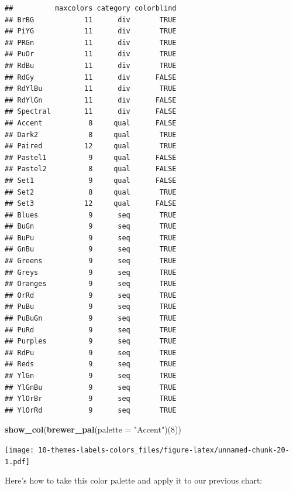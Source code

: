 \documentclass[]{book}
\newenvironment{Shaded}{\begin{snugshade}}{\end{snugshade}}
\newcommand{\KeywordTok}[1]{\textcolor[rgb]{0.13,0.29,0.53}{\textbf{{#1}}}}
\newcommand{\DataTypeTok}[1]{\textcolor[rgb]{0.13,0.29,0.53}{{#1}}}
\newcommand{\DecValTok}[1]{\textcolor[rgb]{0.00,0.00,0.81}{{#1}}}
\newcommand{\StringTok}[1]{\textcolor[rgb]{0.31,0.60,0.02}{{#1}}}
\newcommand{\NormalTok}[1]{{#1}}
\theoremstyle{definition}
\theoremstyle{definition}
\theoremstyle{remark}
\begin{document}
\begin{verbatim}
##          maxcolors category colorblind
## BrBG            11      div       TRUE
## PiYG            11      div       TRUE
## PRGn            11      div       TRUE
## PuOr            11      div       TRUE
## RdBu            11      div       TRUE
## RdGy            11      div      FALSE
## RdYlBu          11      div       TRUE
## RdYlGn          11      div      FALSE
## Spectral        11      div      FALSE
## Accent           8     qual      FALSE
## Dark2            8     qual       TRUE
## Paired          12     qual       TRUE
## Pastel1          9     qual      FALSE
## Pastel2          8     qual      FALSE
## Set1             9     qual      FALSE
## Set2             8     qual       TRUE
## Set3            12     qual      FALSE
## Blues            9      seq       TRUE
## BuGn             9      seq       TRUE
## BuPu             9      seq       TRUE
## GnBu             9      seq       TRUE
## Greens           9      seq       TRUE
## Greys            9      seq       TRUE
## Oranges          9      seq       TRUE
## OrRd             9      seq       TRUE
## PuBu             9      seq       TRUE
## PuBuGn           9      seq       TRUE
## PuRd             9      seq       TRUE
## Purples          9      seq       TRUE
## RdPu             9      seq       TRUE
## Reds             9      seq       TRUE
## YlGn             9      seq       TRUE
## YlGnBu           9      seq       TRUE
## YlOrBr           9      seq       TRUE
## YlOrRd           9      seq       TRUE
\end{verbatim}

\begin{Shaded}
\begin{Highlighting}[]
\KeywordTok{show_col}\NormalTok{(}\KeywordTok{brewer_pal}\NormalTok{(}\DataTypeTok{palette =} \StringTok{"Accent"}\NormalTok{)(}\DecValTok{8}\NormalTok{))}
\end{Highlighting}
\end{Shaded}

\texttt{[image: 10-themes-labels-colors\_files/figure-latex/unnamed-chunk-20-1.pdf]}

Here's how to take this color palette and apply it to our previous
chart:
\end{document}
